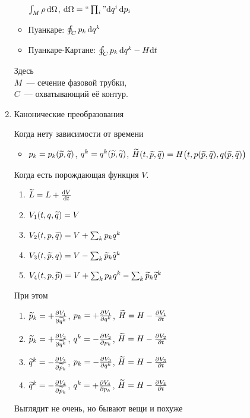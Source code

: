 \documentclass[final,landscape,hardcopy]{notes}
\begin{document}
\begin{multicols*}{4}
\begin{enumerate}
\begin{itemize}
        $\int_M \rho \, \mathrm{d} \Omega $, $\mathrm{d} \Omega =``\prod_i" \mathrm{d} q^i\,\mathrm{d} p_i $
      \item Пуанкаре: $\oint_C p_k \, \mathrm{d} q^k$
      \item Пуанкаре-Картане: $\oint_C p_k \, \mathrm{d} q^k-H\mathrm{d} t$
    \end{itemize}
    Здесь \\
    $M$~--- сечение фазовой трубки,\\ 
    $C$~--- охватывающий её контур.
  \item Канонические преобразования\par
    Когда нету зависимости от времени
    \begin{itemize}
      \item $p_k = p_k(\ov~p, \ov~q)$, $q^k = q^k(\ov~p, \ov~q)$, 
        $\ov~H(t, \ov~p, \ov~q)=  H\bigl(t, p(\ov~p, \ov~q), q(\ov~p, \ov~q)\bigr)$
    \end{itemize}

    Когда есть порождающая функция $V$.
    \begin{enumerate}[1*,start=0]
      \item $\ov~L = L + \fder{V}{t}$
      \item $V_1(t,q,\ov~q)=V$ 
      \item $V_2(t,p,\ov~q)=V+\sum_k p_k q^k$ 
      \item $V_3(t,\ov~p,q)=V-\sum_k \ov~p_k \ov~q^k$ 
      \item $V_4(t,p,\ov~p)=V + \sum_k p_k q^k- \sum_k \ov~p_k \ov~q^k$ 
    \end{enumerate}
    
    При этом
    \begin{enumerate}[$ \langle 1 \rangle $, leftmargin=2ex]
      \item $\ov~p_k = +\pder{V_1}{\ov~q^k}$, $p_k = +\frac{\partial V_1}{\partial q^k}$, $\ov~H = H - \pder{V_1}{t}$
      \item $\ov~p_k = +\pder{V_2}{\ov~q^k}$, $q^k = -\frac{\partial V_2}{\partial p_k}$, $\ov~H = H - \pder{V_2}{t}$
      \item $\ov~q^k = -\pder{V_3}{\ov~p_k}$, $p_k = -\frac{\partial V_3}{\partial q^k}$, $\ov~H = H - \pder{V_3}{t}$
      \item $\ov~q^k = -\pder{V_4}{\ov~p_k}$, $q^k = +\frac{\partial V_4}{\partial p_k}$, $\ov~H = H - \pder{V_4}{t}$
    \end{enumerate}
    Выглядит не очень, но бывают вещи и похуже
\end{enumerate}

\theendnotes

\end{multicols*}
\end{document}
